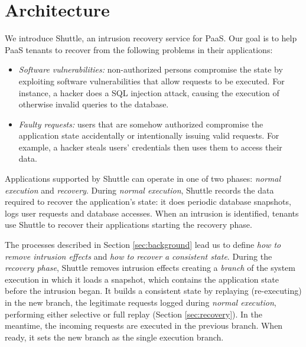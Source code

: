 
\section{Architecture}
\label{sec:architecture}

We introduce Shuttle, an intrusion recovery service for \ac{PaaS}. Our goal is to help \ac{PaaS} tenants to recover from the following problems in their applications:
\begin{itemize}
  \item \textit{Software vulnerabilities:} non-authorized persons compromise the state by exploiting software vulnerabilities that allow requests to be executed. For instance, a hacker does a SQL injection attack, causing the execution of otherwise invalid queries to the database.
  \item \textit{Faulty requests:} users that are somehow authorized compromise the application state accidentally or intentionally issuing valid requests. For example, a hacker steals users' credentials then uses them to access their data.
\end{itemize} 
 

Applications supported by Shuttle can operate in one of two phases: \textit{normal execution} and \textit{recovery}. During \emph{normal execution}, Shuttle records the data required to recover the application's state: it does periodic database snapshots, logs  user requests and database accesses. When an intrusion is identified, tenants use Shuttle to recover their applications starting the recovery phase.

The processes described in Section \ref{sec:background} lead us to define \textit{how to remove intrusion effects} and \textit{how to recover a consistent state}. During the \emph{recovery phase}, Shuttle removes  intrusion effects creating a \textit{branch} of the system execution in which it loads a snapshot, which contains the application state before the intrusion began. It builds a consistent state by replaying (re-executing) in the new branch, the legitimate requests logged during \emph{normal execution}, performing either selective or full replay (Section \ref{sec:recovery}). In the meantime, the incoming requests are executed in the previous branch. When ready, it sets the new branch as the single execution branch.

